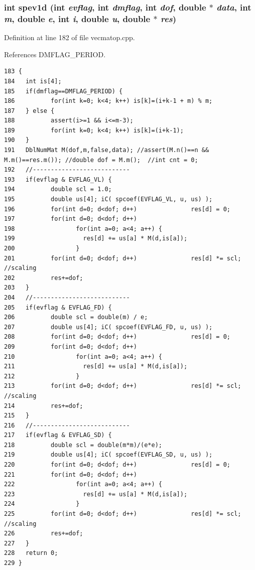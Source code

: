 \subsubsection{\setlength{\rightskip}{0pt plus 5cm}int spev1d (int {\em evflag}, int {\em dmflag}, int {\em dof}, double $\ast$ {\em data}, int {\em m}, double {\em e}, int {\em i}, double {\em u}, double $\ast$ {\em res})}\label{vecmatop_8cpp_812135f57f278cbba10adea2ad903e9b_812135f57f278cbba10adea2ad903e9b}




Definition at line 182 of file vecmatop.cpp.

References DMFLAG\_\-PERIOD.

\footnotesize\begin{verbatim}183 {
184   int is[4];
185   if(dmflag==DMFLAG_PERIOD) {
186          for(int k=0; k<4; k++) is[k]=(i+k-1 + m) % m;
187   } else {
188          assert(i>=1 && i<=m-3);
189          for(int k=0; k<4; k++) is[k]=(i+k-1);
190   }
191   DblNumMat M(dof,m,false,data); //assert(M.n()==n && M.m()==res.m()); //double dof = M.m();  //int cnt = 0;
192   //---------------------------
193   if(evflag & EVFLAG_VL) {
194          double scl = 1.0;
195          double us[4]; iC( spcoef(EVFLAG_VL, u, us) );
196          for(int d=0; d<dof; d++)               res[d] = 0;
197          for(int d=0; d<dof; d++) 
198                 for(int a=0; a<4; a++) {
199                   res[d] += us[a] * M(d,is[a]);
200                 }
201          for(int d=0; d<dof; d++)               res[d] *= scl; //scaling
202          res+=dof;
203   }
204   //---------------------------
205   if(evflag & EVFLAG_FD) {
206          double scl = double(m) / e;
207          double us[4]; iC( spcoef(EVFLAG_FD, u, us) );
208          for(int d=0; d<dof; d++)               res[d] = 0;
209          for(int d=0; d<dof; d++)
210                 for(int a=0; a<4; a++) {
211                   res[d] += us[a] * M(d,is[a]);
212                 }
213          for(int d=0; d<dof; d++)               res[d] *= scl; //scaling
214          res+=dof;
215   }
216   //---------------------------
217   if(evflag & EVFLAG_SD) {
218          double scl = double(m*m)/(e*e);
219          double us[4]; iC( spcoef(EVFLAG_SD, u, us) );
220          for(int d=0; d<dof; d++)               res[d] = 0;
221          for(int d=0; d<dof; d++)
222                 for(int a=0; a<4; a++) {
223                   res[d] += us[a] * M(d,is[a]);
224                 }
225          for(int d=0; d<dof; d++)               res[d] *= scl; //scaling
226          res+=dof;
227   }
228   return 0;
229 }
\end{verbatim}\normalsize 



